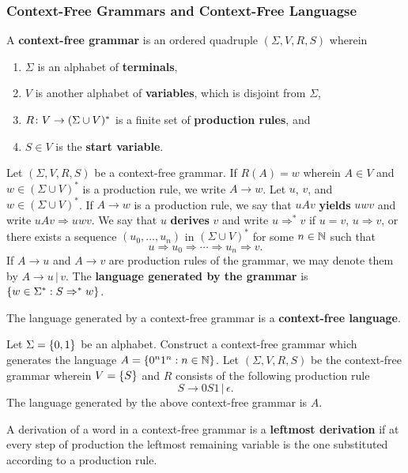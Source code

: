 \subsubsection{Context-Free Grammars and Context-Free Languagse}

\Bdf
    A {\bf context-free grammar} is an ordered quadruple \((\Sigma, V, R, S)\)
    wherein
    \begin{enumerate}
        \item \(\Sigma\) is an alphabet of {\bf terminals},
        \item \(V\) is another alphabet of {\bf variables}, which is disjoint
        from \(\Sigma\),
        \item \(R\colon V\to(\Sigma \cup V)^*\) is a finite set of {\bf
        production rules}, and
        \item \(S \in V\) is the {\bf start variable}.
    \end{enumerate}
\Edf

Let \((\Sigma, V, R, S)\) be a context-free grammar. If \(R(A) = w\) wherein \(A
\in V\) and \(w \in (\Sigma \cup V)^*\) is a production rule, we write \(A \to
w\). Let \(u\), \(v\), and \(w \in (\Sigma \cup V)^*\). If \(A \to w\) is a
production rule, we say that \(u A v\) {\bf yields} \(u w v\) and write \(u A v
\Rightarrow u w v\). We say that \(u\) {\bf derives} \(v\) and write \(u
\Rightarrow^* v\) if \(u = v\), \(u \Rightarrow v\), or there exists a sequence
\((u_0, \ldots, u_n)\) in \((\Sigma \cup V)^*\) for some \(n \in \mathbb{N}\) such
that
\[
    u \Rightarrow u_0 \Rightarrow \cdots \Rightarrow u_n \Rightarrow v.
\]
If \(A \to u\) and \(A \to v\) are production rules of the grammar, we may
denote them by \(A \to u \, | \, v\). The {\bf language generated by the
grammar} is \(\{w \in \Sigma^* : S \Rightarrow^* w\}\).

The language generated by a context-free grammar is a {\bf context-free
language}.

\Bxr
    Let \(\Sigma = \{0, 1\}\) be an alphabet. Construct a context-free grammar
    which generates the language \(A = \{0^n 1^n : n \in \mathbb{N}\}\).
\Exr
\Bsl
    Let \((\Sigma, V, R, S)\) be the context-free grammar wherein \(V =
    \{S\}\) and \(R\) consists of the following production rule
    \[
        S \to 0 S 1 \, | \, \epsilon.
    \]
    The language generated by the above context-free grammar is \(A\).
\Esl

A derivation of a word in a context-free grammar is a {\bf leftmost derivation}
if at every step of production the leftmost remaining variable is the one
substituted according to a production rule.


